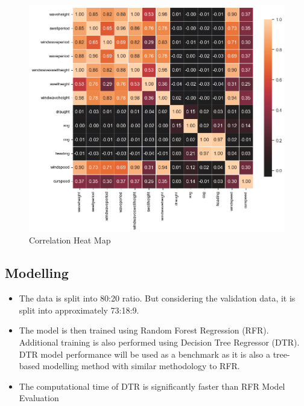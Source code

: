 \newpage

\begin{figure}[h]
    \includegraphics[width=\linewidth,height=\textheight,keepaspectratio]{02_figures/heatmap_corr.png}
    \caption{Correlation Heat Map}
    \label{fig:heatmap1}
\end{figure}

\subsection{Modelling}

\begin{itemize}
    \item The data is split into 80:20 ratio. But considering the validation data, it is split into approximately 73:18:9.
    \item The model is then trained using Random Forest Regression (RFR). Additional training is also performed using Decision Tree Regressor (DTR). DTR model performance will be used as a benchmark as it is also a tree-based modelling method with similar methodology to RFR.
    \item The computational time of DTR is significantly faster than RFR
    Model Evaluation    
\end{itemize}

